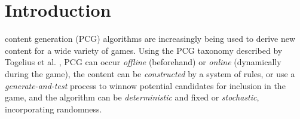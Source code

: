 \documentclass[journal]{IEEEtran}
\begin{document}
%
\IEEEpeerreviewmaketitle


\ifCLASSOPTIONcompsoc
{}
\else
\section{Introduction}
\label{sec:introduction}
\fi




% 
% 
% 
% 

 content generation (PCG) algorithms are increasingly being used to derive new content for a wide variety of games\cite{PCGSURVEY}. Using the PCG taxonomy described by Togelius et al. \cite{SBPCG}, PCG can occur {\it offline} (beforehand) or {\it online} (dynamically during the game), the content can be {\it constructed}
by a system of rules, or use a {\it generate-and-test} process to winnow potential candidates for inclusion in the game, and the algorithm can be {\it deterministic} and fixed or {\it stochastic}, incorporating randomness. 
\end{document}
